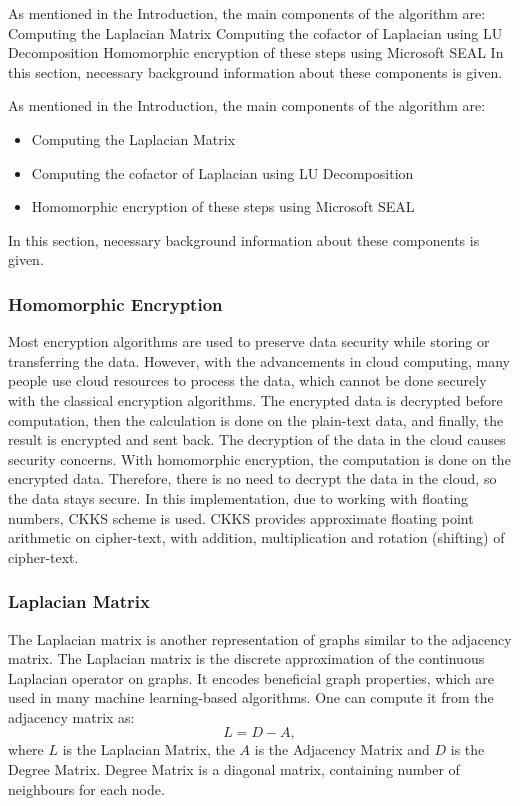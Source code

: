 \documentclass{winslabreport}
\begin{document}
As mentioned in the Introduction, the main components of the algorithm are:
Computing the Laplacian Matrix
Computing the cofactor of Laplacian using LU Decomposition
Homomorphic encryption of these steps using Microsoft SEAL
In this section, necessary background information about these components is given.

As mentioned in the Introduction, the main components of the algorithm are:
\begin{itemize}
    \item Computing the Laplacian Matrix
    \item Computing the cofactor of Laplacian using LU Decomposition
    \item Homomorphic encryption of these steps using Microsoft SEAL
\end{itemize}
In this section, necessary background information about these components is given.
\subsubsection{Homomorphic Encryption}
Most encryption algorithms are used to preserve data security while storing or transferring the data. However, with the advancements in cloud computing, many people use cloud resources to process the data, which cannot be done securely with the classical encryption algorithms.
The encrypted data is decrypted before computation, then the calculation is done on the plain-text data, and finally, the result is encrypted and sent back. The decryption of the data in the cloud causes security concerns.
With homomorphic encryption, the computation is done on the encrypted data. Therefore, there is no need to decrypt the data in the cloud, so the data stays secure.
In this implementation, due to working with floating numbers, CKKS scheme is used. CKKS provides approximate floating point arithmetic on cipher-text, with addition, multiplication and rotation (shifting) of cipher-text. 
\subsubsection{Laplacian Matrix}
The Laplacian matrix is another representation of graphs similar to the adjacency matrix. The Laplacian matrix is the discrete approximation of the continuous Laplacian operator on graphs. It encodes beneficial graph properties, which are used in many machine learning-based algorithms. One can compute it from the adjacency matrix as:
\begin{equation}
    L = D - A,
\end{equation}
where $L$ is the Laplacian Matrix, the $A$ is the Adjacency Matrix and $D$ is the Degree Matrix. Degree Matrix is a diagonal matrix, containing number of neighbours for each node.
\end{document}
